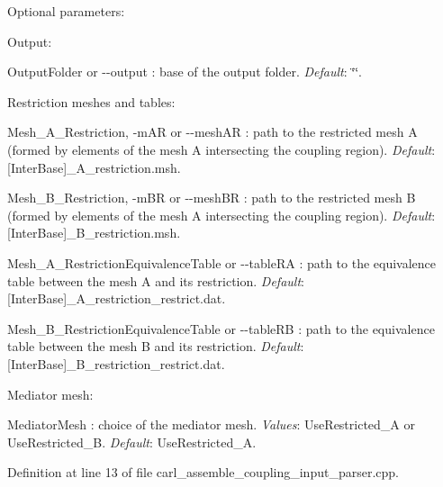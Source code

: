 Optional parameters\+:
\begin{DoxyItemize}
\item Output\+:
\begin{DoxyItemize}
\item {\ttfamily Output\+Folder} or {\ttfamily -\/-\/output} \+: base of the output folder. {\itshape Default}\+: \char`\"{}\char`\"{}.
\end{DoxyItemize}
\item Restriction meshes and tables\+:
\begin{DoxyItemize}
\item {\ttfamily Mesh\+\_\+\+A\+\_\+\+Restriction}, {\ttfamily -\/m\+A\+R} or {\ttfamily -\/-\/mesh\+A\+R} \+: path to the restricted mesh A (formed by elements of the mesh A intersecting the coupling region). {\itshape Default}\+: {\ttfamily \mbox{[}Inter\+Base\mbox{]}\+\_\+\+A\+\_\+restriction.\+msh}.
\item {\ttfamily Mesh\+\_\+\+B\+\_\+\+Restriction}, {\ttfamily -\/m\+B\+R} or {\ttfamily -\/-\/mesh\+B\+R} \+: path to the restricted mesh B (formed by elements of the mesh A intersecting the coupling region). {\itshape Default}\+: {\ttfamily \mbox{[}Inter\+Base\mbox{]}\+\_\+\+B\+\_\+restriction.\+msh}.
\item {\ttfamily Mesh\+\_\+\+A\+\_\+\+Restriction\+Equivalence\+Table} or {\ttfamily -\/-\/table\+R\+A} \+: path to the equivalence table between the mesh A and its restriction. {\itshape Default}\+: {\ttfamily \mbox{[}Inter\+Base\mbox{]}\+\_\+\+A\+\_\+restriction\+\_\+restrict.\+dat}.
\item {\ttfamily Mesh\+\_\+\+B\+\_\+\+Restriction\+Equivalence\+Table} or {\ttfamily -\/-\/table\+R\+B} \+: path to the equivalence table between the mesh B and its restriction. {\itshape Default}\+: {\ttfamily \mbox{[}Inter\+Base\mbox{]}\+\_\+\+B\+\_\+restriction\+\_\+restrict.\+dat}.
\end{DoxyItemize}
\item Mediator mesh\+:
\begin{DoxyItemize}
\item {\ttfamily Mediator\+Mesh} \+: choice of the mediator mesh. {\itshape Values}\+: {\ttfamily Use\+Restricted\+\_\+\+A} or {\ttfamily Use\+Restricted\+\_\+\+B}. {\itshape Default}\+: {\ttfamily Use\+Restricted\+\_\+\+A}. 
\end{DoxyItemize}
\end{DoxyItemize}

Definition at line 13 of file carl\+\_\+assemble\+\_\+coupling\+\_\+input\+\_\+parser.\+cpp.


